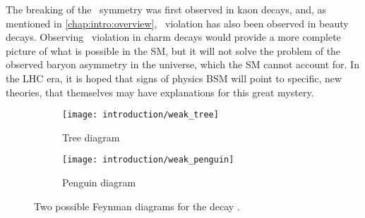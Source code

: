 The breaking of the \CP\ symmetry was first observed in kaon decays, and, as 
mentioned in \cref{chap:intro:overview}, \CP\ violation has also been observed 
in beauty decays.
Observing \CP\ violation in charm decays would provide a more complete picture 
of what is possible in the \ac{SM}, but it will not solve the problem of the 
observed baryon asymmetry in the universe, which the \ac{SM} cannot account 
for.
In the \ac{LHC} era, it is hoped that signs of physics \acl{BSM} will point to 
specific, new theories, that themselves may have explanations for this great 
mystery.

\begin{figure}
  \begin{subfigure}{0.40\textwidth}
    \centering
    \texttt{[image: introduction/weak\_tree]}
    \caption{Tree diagram}
    \label{fig:intro:sm:weak_feynman:tree}
  \end{subfigure}
  \begin{subfigure}{0.55\textwidth}
    \centering
    \texttt{[image: introduction/weak\_penguin]}
    \caption{Penguin diagram}
    \label{fig:intro:sm:weak_feynman:penguin}
  \end{subfigure}
  \caption{%
    Two possible Feynman diagrams for the decay \decay{\PBzero}{\PKplus\Ppiminus}.
  }
  \label{fig:intro:sm:weak_feynman}
\end{figure}
